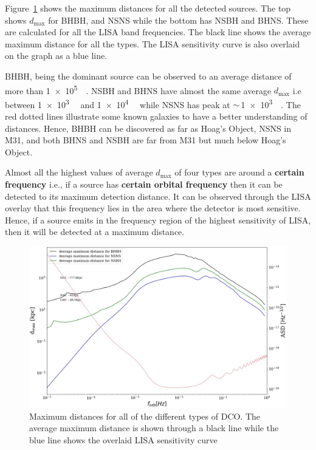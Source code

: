 \documentclass[journal, twocolumn]{IEEEtran}
\newcommand{\kpc}{\kilo\parsec}
\begin{document}
    Figure~\ref{fig:dmax} shows the maximum distances for all the detected sources.
    The top shows $d_{\max}$ for BHBH, and NSNS while the bottom has NSBH and BHNS\@.
    These are calculated for all the LISA band frequencies.
    The black line shows the average maximum distance for all the types.
    The LISA sensitivity curve is also overlaid on the graph as a blue line.

    BHBH, being the dominant source can be observed to an average distance of more than \SI{1e5}{\kpc}.
    NSBH and BHNS have almost the same average $d_{\max}$ i.e between \SI{1e3}{\kpc} and \SI{1e4}{\kpc} while NSNS has peak at $\sim\,$\SI{1e3}{\kpc}.
    The red dotted lines illustrate some known galaxies to have a better understanding of distances.
    Hence, BHBH can be discovered as far as Hoag's Object, NSNS in M31, and both BHNS and NSBH are far from M31 but much below Hoag's Object.


    Almost all the highest values of average $d_{\max}$ of four types are around a \textbf{certain frequency} i.e., if a source has \textbf{certain orbital frequency} then it can be detected to its maximum detection distance.
    It can be observed through the LISA overlay that this frequency lies in the area where the detector is most sensitive.
    Hence, if a source emits in the frequency region of the highest sensitivity of LISA, then it will be detected at a maximum distance.

    \begin{figure}
        \centering
        \includegraphics[width=\linewidth]{images/DMAX}
        \caption{Maximum distances for all of the different types of DCO. The average maximum distance is
        shown through a black line while the blue line shows the overlaid LISA sensitivity curve}
        \label{fig:dmax}
    \end{figure}
\end{document}
